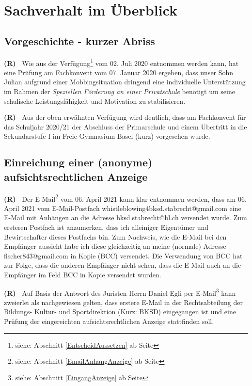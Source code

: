 \documentclass[paper=a4,fontsize=12pt, oneside, numbers=noenddot]{scrbook}
\newcounter{rz}
\newcommand{\Rz}{
	\addtocounter{rz}{1}\textbf{(R\arabic{rz})~}
}
\newcommand{\footnoteExt}[1]{\footnote{siehe: Abschnitt \ref{#1} ab Seite \pageref{#1}}}
\begin{document}
\clearpairofpagestyles %
\chead{\headmark} %
\cfoot*{\pagemark} %


\tableofcontents

\chapter{Sachverhalt im Überblick}

\section{Vorgeschichte - kurzer Abriss}
\Rz Wie aus der Verfügung\footnoteExt{EntscheidAussetzen} vom 02. Juli 2020 entnommen werden kann, hat eine Prüfung am Fachkonvent vom 07. Januar 2020 ergeben, dass unser Sohn Julian aufgrund einer Mobbingsituation dringend eine individuelle Unterstützung im Rahmen der \textit{Speziellen Förderung an einer Privatschule} benötigt um seine schulische Leistungsfähigkeit und Motivation zu stabilisieren. 

\Rz Aus der oben erwähnten Verfügung wird deutlich, dass am Fachkonvent für das Schuljahr 2020/21 der Abschluss der Primarschule und einem Übertritt in die Sekundarstufe I im Freie Gymnasium Basel (kurz) vorgesehen wurde. 


\section{Einreichung einer (anonyme) aufsichtsrechtlichen Anzeige}
\Rz Der E-Mail\footnoteExt{EmailAnhangAnzeige} vom 06. April 2021 kann klar entnommen werden, dass am 06. April 2021 vom E-Mail-Postfach whistleblowing4bksd.stabrecht@gmail.com eine E-Mail mit Anhängen an die Adresse bksd.stabrecht@bl.ch versendet wurde. Zum ersteren Postfach ist anzumerken, dass ich alleiniger Eigentümer und Bewirtschafter dieses Postfachs bin. Zum Nachweis, wie die E-Mail bei den Empfänger aussieht habe ich diese gleichzeitig an meine (normale) Adresse fischer843@gmail.com in Kopie (BCC) versendet. Die Verwendung von BCC hat zur Folge, dass die anderen Empfänger nicht sehen, dass die E-Mail auch an die Empfänger im Feld BCC in Kopie versendet wurden. 

\Rz Auf Basis der Antwort des Juristen Herrn Daniel Egli per E-Mail\footnoteExt{EingangAnzeige} kann zweierlei als nachgewiesen gelten, dass erstere E-Mail in der Rechtsabteilung der Bildungs- Kultur- und Sportdirektion (Kurz: BKSD) eingegangen ist und eine Prüfung der eingereichten aufsichtsrechtlichen Anzeige stattfinden soll. 
\end{document}
